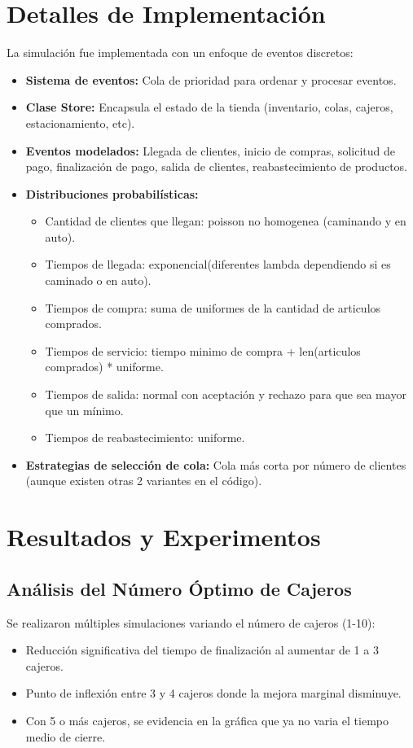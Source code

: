 \documentclass[12pt, a4paper]{article}
\begin{document}
\section{Detalles de Implementación}
La simulación fue implementada con un enfoque de eventos discretos:
\begin{itemize}
    \item \textbf{Sistema de eventos:} Cola de prioridad para ordenar y procesar eventos.
    \item \textbf{Clase Store:} Encapsula el estado de la tienda (inventario, colas, cajeros, estacionamiento, etc).
    \item \textbf{Eventos modelados:} Llegada de clientes, inicio de compras, solicitud de pago, finalización de pago, salida de clientes, reabastecimiento de productos.
    \item \textbf{Distribuciones probabilísticas:} 
    \begin{itemize}
        \item Cantidad de clientes que llegan: poisson no homogenea (caminando y en auto).
        \item Tiempos de llegada: exponencial(diferentes lambda dependiendo si es caminado o en auto).
        \item Tiempos de compra: suma de uniformes de la cantidad de articulos comprados.
        \item Tiempos de servicio: tiempo minimo de compra + len(articulos comprados) * uniforme.
        \item Tiempos de salida: normal con aceptación y rechazo para que sea mayor que un mínimo.
        \item Tiempos de reabastecimiento: uniforme.
    \end{itemize}
    \item \textbf{Estrategias de selección de cola:} Cola más corta por número de clientes (aunque existen otras 2 variantes en el código).
\end{itemize}

\section{Resultados y Experimentos}

\subsection{Análisis del Número Óptimo de Cajeros}
Se realizaron múltiples simulaciones variando el número de cajeros (1-10):
\begin{itemize}
    \item Reducción significativa del tiempo de finalización al aumentar de 1 a 3 cajeros.
    \item Punto de inflexión entre 3 y 4 cajeros donde la mejora marginal disminuye.
    \item Con 5 o más cajeros, se evidencia en la gráfica que ya no varia el tiempo medio de cierre. 
\end{itemize}
\end{document}
